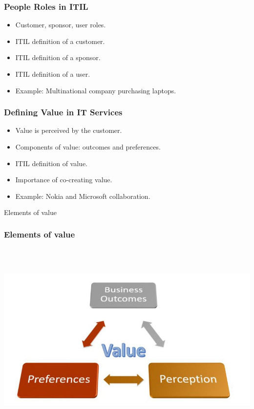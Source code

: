 \documentclass[aspectratio=169, table]{beamer}
\begin{document}
\begin{frame}
	\frametitle{People Roles in ITIL}
	\begin{itemize}
		\item Customer, sponsor, user roles.
		\item ITIL definition of a customer.
		\item ITIL definition of a sponsor.
		\item ITIL definition of a user.
		\item Example: Multinational company purchasing laptops.
	\end{itemize}
\end{frame}

\begin{frame}
	\frametitle{Defining Value in IT Services}
	\begin{itemize}
		\item Value is perceived by the customer.
		\item Components of value: outcomes and preferences.
		\item ITIL definition of value.
		\item Importance of co-creating value.
		\item Example: Nokia and Microsoft collaboration.
	\end{itemize}
\end{frame}

\begin{frame}{Elements of value} 	 \frametitle{Elements of value} \begin{center} 	\includegraphics[width=0.8\linewidth]{images/image-02.png} \end{center} \end{frame}
\end{document}
